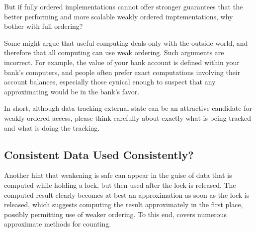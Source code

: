 \QuickQuiz{}
	But if fully ordered implementations cannot offer stronger
	guarantees that the better performing and more scalable weakly
	ordered imptementations, why bother with full ordering?
 \QuickQuizEnd

Some might argue that useful computing deals only with the outside world,
and therefore that all computing can use weak ordering.
Such arguments are incorrect.
For example, the value of your bank account is defined within your bank's
computers, and people often prefer exact computations involving their
account balances, especially those cynical enough to suspect that any
approximating would be in the bank's favor.

In short, although data tracking external state can be an attractive
candidate for weakly ordered access, please think carefully about
exactly what is being tracked and what is doing the tracking.

\subsection{Consistent Data Used Consistently?}
\label{sec:app:questions:Consistent Data Used Consistently?}

Another hint that weakening is safe can appear in the guise of data
that is computed while holding a lock, but then used after the lock
is released.
The computed result clearly becomes at best an approximation as soon as
the lock is released, which suggests computing the result approximately
in the first place, possibly permitting use of weaker ordering.
To this end,  covers numerous approximate methods
for counting.

